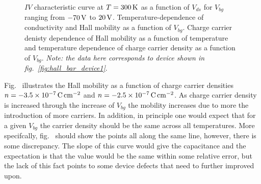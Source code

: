 \begin{figure}[ht]
	\qquad
	\caption[Output characteristics and channel properties of lightly $p$-doped  with 2D/2D contacts]{\protect{} $IV$ characteristic curve at $T=300\,\mathrm{K}$ as a function of $V_{ds}$ for $V_{bg}$ ranging from $-70\,\mathrm{V}$ to $20\,\mathrm{V}$. \protect{} Temperature-dependence of conductivity and \protect{} Hall mobility as a function of $V_{bg}$. \protect{} Charge carrier denisty dependence of Hall mobility as a function of temperature and \protect{} temperature dependence of charge carrier density as a function of $V_{bg}$. \emph{Note: the data here corresponds to device shown in fig.~\ref{fig:hall_bar_device1}}.}
	\label{fig:hall_measurement_data_lightly}
\end{figure}
Fig.~ illustrates the Hall mobility as a function of charge carrier densities $n=-3.5\times 10^{-7}\,\mathrm{C}\,\mathrm{cm}^{-2}$ and $n=-2.5\times 10^{-7}\,\mathrm{C}\,\mathrm{cm}^{-2}$. As charge carrier density is increased through the increase of $V_{bg}$ the mobility increases due to more the introduction of more carriers. In addition, in principle one would expect that for a given $V_{bg}$ the carrier density should be the same across all temperatures. More specifcally, fig.~ should show the points all along the same line, however, there is some discrepancy. The slope of this curve would give the capacitance and the expectation is that the value would be the same within some relative error, but the lack of this fact points to some device defects that need to further improved upon.

